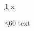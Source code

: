 \documentclass{article}
\begin{document}
\newcount\k
\loop\advance\k1 \lipsum[2][1-2] x \par\ifnum\k<60 \repeat
text\par
\end{document}
